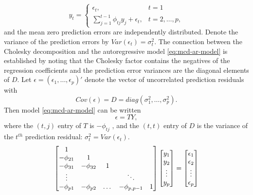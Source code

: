 \begin{equation} \label{eq:mcd-ar-model}
y_t = \left\{ \begin{array}{ll} \epsilon_t, & t = 1\\
\sum_{j = 1}^{t-1} \phi_{tj} y_j + \epsilon_t, & t = 2, \dots, p,
\end{array}\right.
\end{equation}
\noindent
and the mean zero prediction errors are independently distributed. Denote the variance of the prediction errors by $Var\left(\epsilon_t\right) = \sigma_t^2 $. The connection between the Cholesky decomposition and the autoregressive model \eqref{eq:mcd-ar-model} is established by noting that the Cholesky factor contains the negatives of the regression coefficients and the prediction error variances are the diagonal elements of $D$.  Let $\epsilon = \left(\epsilon_1, \dots, \epsilon_p\right)'$ denote the vector of uncorrelated prediction residuals with
\[
Cov\left(\epsilon\right) = D = diag\left(\sigma_1^2,\dots, \sigma_p^2\right).
\]
\noindent
Then model \eqref{eq:mcd-ar-model} can be written 
\begin{equation} \label{eq:e-equals-T-Y}
\epsilon = TY,
\end{equation}
\noindent
where the $\left(t, j\right)$ entry of $T$ is $-\phi_{tj}$ , and the $(t, t)$ entry of $D$ is the variance of the $t^{th}$ prediction residual: $\sigma_t^2 = Var\left(\epsilon_t\right)$. 
\begin{align}
\begin{bmatrix}
$1$&&&&\\
-\phi_{21}&$1$&&&\\
-\phi_{31}&-\phi_{32}&$1$&&\\
\vdots &&&\ddots& \\
-\phi_{p1}&-\phi_{p2}& \dots & -\phi_{p,p-1}&$1$\\
\end{bmatrix}
\begin{bmatrix}
y_1 \\
y_2 \\ \vdots \\ y_p
\end{bmatrix} = \begin{bmatrix}
\epsilon_1 \\
\epsilon_2 \\ \vdots \\ \epsilon_p
\end{bmatrix}
\end{align}


